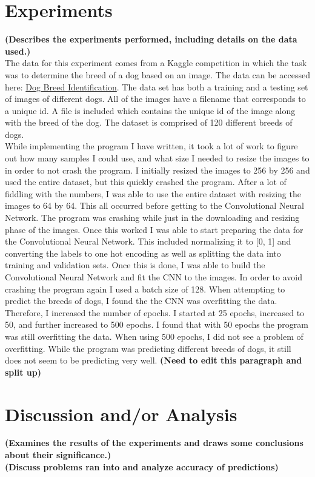 \documentclass[12pt]{article}
\begin{document}
\section{Experiments}
\textbf{(Describes the experiments performed, including details on the data used.)}\\
\indent The data for this experiment comes from a Kaggle competition in which the task was to determine the breed of a dog based on an image.  The data can be accessed here: \href{https://www.kaggle.com/c/dog-breed-identification}
{Dog Breed Identification}.  The data set has both a training and a testing set of images of different dogs.  All of the images have a filename that corresponds to a unique id.  A file is included which contains the unique id of the image along with the breed of the dog.  The dataset is comprised of 120 different breeds of dogs.\\
\indent While implementing the program I have written, it took a lot of work to figure out how many samples I could use, and what size I needed to resize the images to in order to not crash the program.  I initially resized the images to 256 by 256 and used the entire dataset, but this quickly crashed the program.  After a lot of fiddling with the numbers, I was able to use the entire dataset with resizing the images to 64 by 64.  This all occurred before getting to the Convolutional Neural Network.  The program was crashing while just in the downloading and resizing phase of the images.  Once this worked I was able to start preparing the data for the Convolutional Neural Network.  This included normalizing it to [0, 1] and converting the labels to one hot encoding as well as splitting the data into training and validation sets.  Once this is done, I was able to build the Convolutional Neural Network and fit the CNN to the images.  In order to avoid crashing the program again I used a batch size of 128.  When attempting to predict the breeds of dogs, I found the the CNN was overfitting the data.  Therefore, I increased the number of epochs.  I started at 25 epochs, increased to 50, and further increased to 500 epochs.  I found that with 50 epochs the program was still overfitting the data.  When using 500 epochs, I did not see a problem of overfitting.  While the program was predicting different breeds of dogs, it still does not seem to be predicting very well.  \textbf{(Need to edit this paragraph and split up)}\\

\section{Discussion and/or Analysis}
\textbf{(Examines the results of the experiments and draws some conclusions about their significance.)}\\
\textbf{(Discuss problems ran into and analyze accuracy of predictions)}
\end{document}
